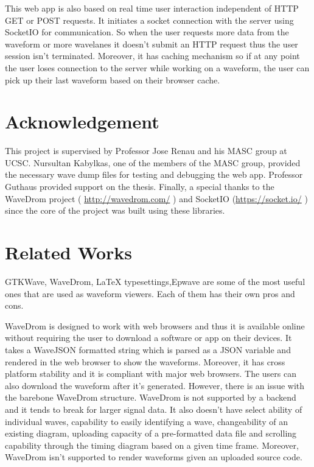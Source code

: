 \documentclass[14pt]{extarticle}
\begin{document}
 This web app is also based on real time user interaction independent of HTTP GET or POST requests. It initiates a socket connection with the server using SocketIO for communication.  So when the user requests more data from the waveform or more wavelanes it doesn’t submit an HTTP request thus the user session isn’t terminated. Moreover, it has caching mechanism so if at any point the user loses connection to the server while working on a waveform, the user can pick up their last waveform based on their browser cache.

\section{Acknowledgement}
This project is supervised by Professor Jose Renau and his MASC group at UCSC. Nursultan Kabylkas, one of the members of the MASC group, provided the necessary wave dump files for testing and debugging the web app. Professor Guthaus provided support on the thesis. Finally, a special thanks to the WaveDrom project ( \url{http://wavedrom.com/} ) and SocketIO (\url{https://socket.io/} ) since the core of the project was built using these libraries.

\section{Related Works}
\par GTKWave, WaveDrom, LaTeX typesettings,Epwave are some of the most useful ones that are used as waveform viewers. Each of them has their own pros and cons.
\par WaveDrom is designed to work with web browsers and thus it is available online without requiring the user to download a software or app on their devices. It takes a WaveJSON formatted string which is parsed as a JSON variable and rendered in the web browser to show the waveforms. Moreover, it has cross platform stability and it is compliant with major web browsers. The users can also download the waveform after it's generated. However, there is an issue with the barebone WaveDrom structure. WaveDrom is not supported by a backend and it tends to break for larger signal data. It also doesn’t have select ability of individual waves, capability to easily identifying a wave, changeability of an existing diagram, uploading capacity of a pre-formatted data file and scrolling capability through the timing diagram based on a given time frame. Moreover, WaveDrom isn’t supported to render waveforms given an uploaded source code. 
\end{document}
